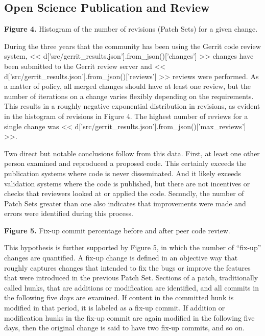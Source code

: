 \documentclass{frontiersENG} %
\begin{document}
\subsection{Open Science Publication and Review}

\textbf{Figure 4. }{Histogram of the number of revisions (Patch Sets) for a
given change.}\label{fig:04}

During the three years that the community has been using the Gerrit code review
system, << d['src/gerrit_results.json'].from_json()['changes'] >> changes have
been submitted to the Gerrit review server and
<< d['src/gerrit_results.json'].from_json()['reviews'] >> reviews were performed.
As a matter of policy, all merged changes should have at least one review,
but the number of iterations on a change varies flexibly depending on the
requirements. This results in a roughly negative exponential distribution in
revisions, as evident in the histogram of revisions in
Figure 4.  The highest number of reviews
for a single change was
<< d['src/gerrit_results.json'].from_json()['max_reviews'] >>.

Two direct but notable conclusions follow from this data. First, at least one
other person examined and reproduced a proposed code.  This certainly exceeds
the publication systems where code is never disseminated. And it likely exceeds
validation systems where the code is published, but there are not incentives or
checks that reviewers looked at or applied the code.  Secondly, the number of
Patch Sets greater than one also indicates that improvements were made and
errors were identified during this process.

\textbf{Figure 5. }{Fix-up commit percentage before and after peer code review.}
\label{fig:05}

This hypothesis is further supported by Figure 5, in which the number of
``fix-up'' changes are quantified. A fix-up change is defined in an objective
way that roughly captures changes that intended to fix the bugs or improve the
features that were introduced in the previous Patch Set.  Sections of a patch,
traditionally called hunks, that are additions or modification are identified,
and all commits in the following five days are examined.  If content in the
committed hunk is modified in that period, it is labeled as a fix-up commit.
If addition or modification hunks in the fix-up commit are again modified in
the following five days, then the original change is said to have two fix-up
commits, and so on.
\end{document}
